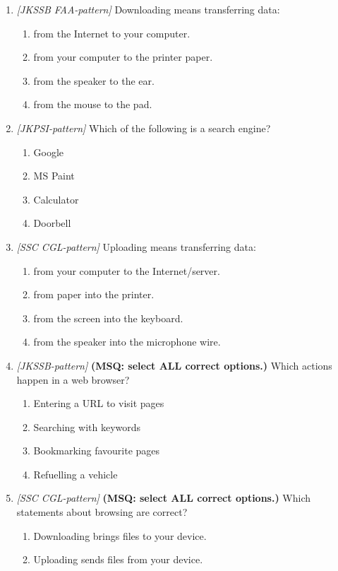 \begin{enumerate}[label=\textbf{Q\arabic*.}, leftmargin=*]
\item \textit{[JKSSB FAA-pattern]} Downloading means transferring data:
  \begin{enumerate}[label=\Alph*.]
    \item from the Internet to your computer.
    \item from your computer to the printer paper.
    \item from the speaker to the ear.
    \item from the mouse to the pad.
  \end{enumerate}
\item \textit{[JKPSI-pattern]} Which of the following is a search engine?
  \begin{enumerate}[label=\Alph*.]
    \item Google
    \item MS Paint
    \item Calculator
    \item Doorbell
  \end{enumerate}
\item \textit{[SSC CGL-pattern]} Uploading means transferring data:
  \begin{enumerate}[label=\Alph*.]
    \item from your computer to the Internet/server.
    \item from paper into the printer.
    \item from the screen into the keyboard.
    \item from the speaker into the microphone wire.
  \end{enumerate}
\item \textit{[JKSSB-pattern]} \textbf{(MSQ: select ALL correct options.)} Which actions happen in a web browser?
  \begin{enumerate}[label=\Alph*.]
    \item Entering a URL to visit pages
    \item Searching with keywords
    \item Bookmarking favourite pages
    \item Refuelling a vehicle
  \end{enumerate}
\item \textit{[SSC CGL-pattern]} \textbf{(MSQ: select ALL correct options.)} Which statements about browsing are correct?
  \begin{enumerate}[label=\Alph*.]
    \item Downloading brings files to your device.
    \item Uploading sends files from your device.

\end{enumerate}
\end{enumerate}
